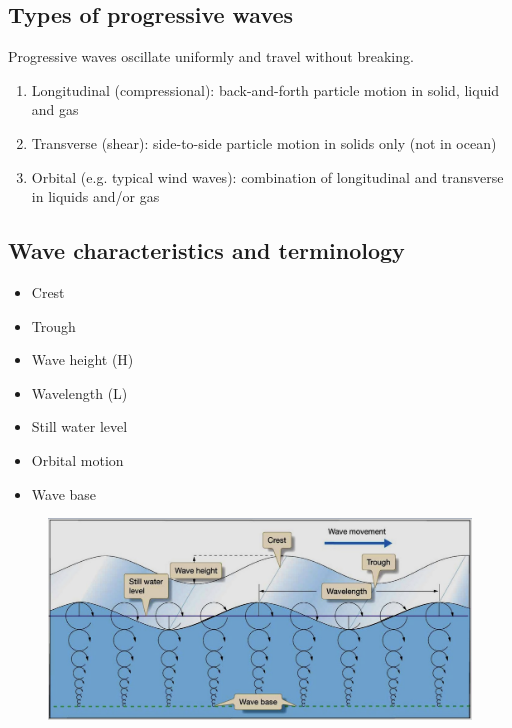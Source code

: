\subsection{Types of progressive waves}

Progressive waves oscillate uniformly and travel without breaking.

\begin{enumerate}
    \item Longitudinal (compressional): back-and-forth particle motion in solid,
        liquid and gas
    \item Transverse (shear): side-to-side particle motion in solids only (not in ocean)
    \item Orbital (e.g. typical wind waves): combination of longitudinal
        and transverse in liquids and/or gas
\end{enumerate}

\subsection{Wave characteristics and terminology}

\begin{itemize}
    \item Crest
    \item Trough
    \item Wave height (H)
    \item Wavelength (L)
    \item Still water level
    \item Orbital motion
    \item Wave base
\end{itemize}

\begin{figure}[H]
    \centering
    \includegraphics[width=0.9\linewidth]{img/wave_characteristics.png}
\end{figure}

